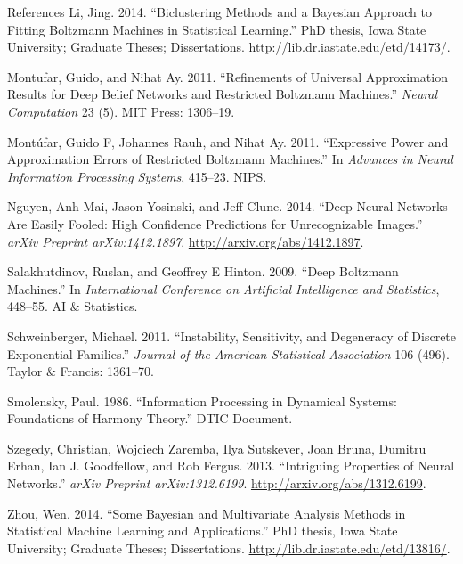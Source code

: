 \documentclass[ignorenonframetext,]{beamer}
\theoremstyle{definition}
\begin{document}
\begin{frame}[allowframebreaks]{References}
\leavevmode\hypertarget{ref-li2014biclustering}{}%
Li, Jing. 2014. ``Biclustering Methods and a Bayesian Approach to
Fitting Boltzmann Machines in Statistical Learning.'' PhD thesis, Iowa
State University; Graduate Theses; Dissertations.
\url{http://lib.dr.iastate.edu/etd/14173/}.

\leavevmode\hypertarget{ref-montufar2011refinements}{}%
Montufar, Guido, and Nihat Ay. 2011. ``Refinements of Universal
Approximation Results for Deep Belief Networks and Restricted Boltzmann
Machines.'' \emph{Neural Computation} 23 (5). MIT Press: 1306--19.

\leavevmode\hypertarget{ref-montufar2011expressive}{}%
Montúfar, Guido F, Johannes Rauh, and Nihat Ay. 2011. ``Expressive Power
and Approximation Errors of Restricted Boltzmann Machines.'' In
\emph{Advances in Neural Information Processing Systems}, 415--23. NIPS.

\leavevmode\hypertarget{ref-nguyen2014deep}{}%
Nguyen, Anh Mai, Jason Yosinski, and Jeff Clune. 2014. ``Deep Neural
Networks Are Easily Fooled: High Confidence Predictions for
Unrecognizable Images.'' \emph{arXiv Preprint arXiv:1412.1897}.
\url{http://arxiv.org/abs/1412.1897}.

\leavevmode\hypertarget{ref-salakhutdinov2009deep}{}%
Salakhutdinov, Ruslan, and Geoffrey E Hinton. 2009. ``Deep Boltzmann
Machines.'' In \emph{International Conference on Artificial Intelligence
and Statistics}, 448--55. AI \& Statistics.

\leavevmode\hypertarget{ref-schweinberger2011instability}{}%
Schweinberger, Michael. 2011. ``Instability, Sensitivity, and Degeneracy
of Discrete Exponential Families.'' \emph{Journal of the American
Statistical Association} 106 (496). Taylor \& Francis: 1361--70.

\leavevmode\hypertarget{ref-smolensky1986information}{}%
Smolensky, Paul. 1986. ``Information Processing in Dynamical Systems:
Foundations of Harmony Theory.'' DTIC Document.

\leavevmode\hypertarget{ref-szegedy2013intriguing}{}%
Szegedy, Christian, Wojciech Zaremba, Ilya Sutskever, Joan Bruna,
Dumitru Erhan, Ian J. Goodfellow, and Rob Fergus. 2013. ``Intriguing
Properties of Neural Networks.'' \emph{arXiv Preprint arXiv:1312.6199}.
\url{http://arxiv.org/abs/1312.6199}.

\leavevmode\hypertarget{ref-zhou2014some}{}%
Zhou, Wen. 2014. ``Some Bayesian and Multivariate Analysis Methods in
Statistical Machine Learning and Applications.'' PhD thesis, Iowa State
University; Graduate Theses; Dissertations.
\url{http://lib.dr.iastate.edu/etd/13816/}.

\end{frame}
\end{document}
